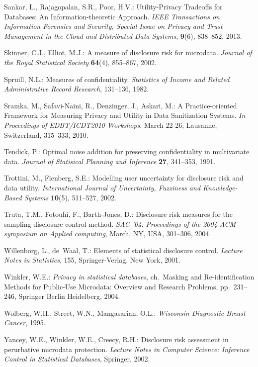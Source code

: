 \documentclass{llncs}
\begin{document}
\begin{thebibliography}{10}
Sankar, L., Rajagopalan, S.R., Poor, H.V.:
Utility-Privacy Tradeoffs for Databases: An Information-theoretic
Approach.
\emph{IEEE Transactions on Information Forensics and Security,
Special Issue on Privacy and Trust Management in the Cloud and
Distributed Data Systems},\textbf{ 9}(6), 838--852, 2013.

Skinner, C.J., Elliot, M.J.: {A measure of disclosure risk for
  microdata}. \emph{Journal of the Royal Statistical Society} \textbf{64}(4), 855--867, 2002.

Spruill, N.L.: {Measures of confidentiality}. \emph{Statistics of Income and
  Related Administrative Record Research},  131--136, 1982.

Sramka, M., Safavi-Naini, R., Denzinger, J., Askari, M.:
A Practice-oriented Framework for Measuring Privacy and
Utility in Data Sanitization Systems.
\emph{In Proceedings of EDBT/ICDT2010 Workshops}, March 22-26, Lausanne, Switzerland, 315--333, 2010.

Tendick, P.: {Optimal noise addition for preserving confidentiality in
  multivariate data}. \emph{Journal of Statisical Planning and Inference} \textbf{27}, 341--353, 1991.

Trottini, M.,  Fienberg, S.E.: {Modelling user uncertainty for
  disclosure risk and data utility}. \emph{International Journal of Uncertainty,
  Fuzziness and Knowledge-Based Systems} \textbf{10}(5),  511--527, 2002.

Truta, T.M.,  Fotouhi, F.,  Barth-Jones, D.: {Disclosure
  risk measures for the sampling disclosure control method}. \emph{SAC '04:
  Proceedings of the 2004 ACM symposium on Applied computing}, March, NY, USA, 301--306, 2004.

Willenborg, L.,  de~Waal, T.: {Elements of statistical disclosure
  control}. \emph{Lecture Notes in Statistics}, 155, Springer-Verlag, New York,
  2001.

Winkler, W.E.: \emph{Privacy in statistical databases}, ch.~Masking and
  Re-identification Methods for Public-Use Microdata: Overview and Research
  Problems, pp.~231--246, Springer Berlin Heidelberg, 2004.

Wolberg, W.H.,  Street, W.N.,  Mangasarian,  O.L.: \emph{{Wisconsin
  Diagnostic Breast Cancer}}, 1995.

Yancey, W.E.,   Winkler, W.E., Creecy, R.H.: {Disclosure
  risk assessment in perurbative microdata protection}. \emph{Lecture Notes in
  Computer Science: Inference Control in Statistical Databases}, Springer, 2002.

\end{thebibliography}
\end{document}
